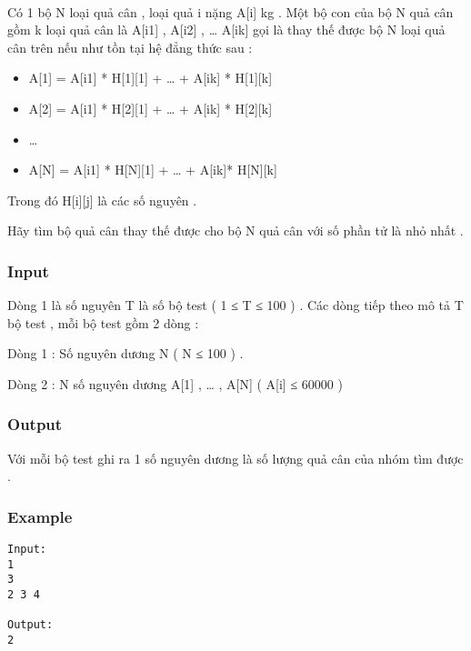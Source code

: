 

 

Có 1 bộ N loại quả cân , loại quả i nặng A[i] kg . Một bộ con của bộ N quả cân gồm k loại quả cân là A[i1] , A[i2] , … A[ik] gọi là thay thế được bộ N loại quả cân trên nếu như tồn tại hệ đẳng thức sau :
\begin{itemize}
	\item A[1] = A[i1] * H[1][1] + … + A[ik] * H[1][k]
	\item A[2] = A[i1] * H[2][1] + … + A[ik] * H[2][k]
	\item …
	\item A[N] = A[i1] * H[N][1] + … + A[ik]* H[N][k]
\end{itemize}

Trong đó H[i][j] là các số nguyên .


Hãy tìm bộ quả cân thay thế được cho bộ N quả cân với số phần tử là nhỏ nhất .

\subsubsection{Input}

Dòng 1 là số nguyên T là số bộ test ( 1 ≤ T ≤ 100 ) . Các dòng tiếp theo mô tả T bộ test , mỗi bộ test gồm 2 dòng :


Dòng 1 : Số nguyên dương N ( N ≤ 100 ) .


Dòng 2 : N số nguyên dương A[1] , … , A[N] ( A[i] ≤ 60000 )

\subsubsection{Output}

Với mỗi bộ test ghi ra 1 số nguyên dương là số lượng quả cân của nhóm tìm được .

\subsubsection{Example}
\begin{verbatim}
Input:
1
3
2 3 4

Output:
2
\end{verbatim}
